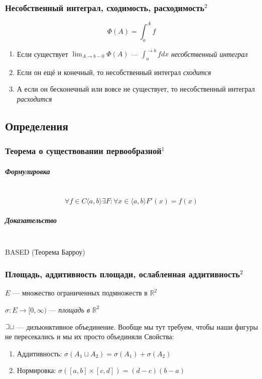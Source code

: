 \documentclass{article}
\def\letus{%
\mathord{\setbox0=\hbox{$\exists$}%
         \hbox{\kern 0.125\wd0%
               \vbox to \ht0{%
                  \hrule width 0.75\wd0%
                  \vfill%
                  \hrule width 0.75\wd0}%
               \vrule height \ht0%
               \kern 0.125\wd0}%
       }%
        }
\let\vanillasubparagraph\subparagraph
\renewcommand{\subparagraph}[1]{\vanillasubparagraph{#1}\mbox{}\\}
\begin{document}
\subsubsection{Несобственный интеграл, сходимость, расходимость\texorpdfstring{$^2$}{}}

\[\Phi(A) = \int_a^A f\] 

\begin{enumerate}
    \item Если существует $\lim_{A \rightarrow b - 0}{\Phi(A)}$ --- $\int_a^{\rightarrow b}{f dx}$ \textit{несобственный интеграл}
    \item Если он ещё и конечный, то несобственный интеграл \textit{сходится}
    \item А если он бесконечный или вовсе не существует, то несобственный интеграл \textit{расходится}
\end{enumerate}
\newpage
\subsection{Определения}
\subsubsection{Теорема о существовании первообразной\texorpdfstring{$^1$}{}}
\subparagraph{Формулировка}
$$
\forall f\in C\langle a, b \rangle \exists F : \forall x \in \langle a, b \rangle F'(x) = f(x)
$$

\subparagraph{Доказательство}
BASED (Теорема Барроу)


\subsubsection{Площадь, аддитивность площади, ослабленная аддитивность\texorpdfstring{$^2$}{}}

$E$ --- множество ограниченных подмножеств в $\mathbb{R}^2$

$\sigma: E \rightarrow [0, \infty)$ --- \textit{площадь в} $\mathbb{R}^2$

$\letus \sqcup$ --- дизъюнктивное объединение. Вообще мы тут требуем, чтобы наши фигуры не пересекались и мы их просто объединяли
Свойства:

\begin{enumerate}
    \item Аддитивность: $\sigma(A_1 \sqcup A_2) = \sigma(A_1) + \sigma(A_2)$
    \item Нормировка: $\sigma([a, b] \times [c, d]) = (d - c)(b - a)$
\end{enumerate}
\end{document}
